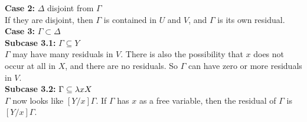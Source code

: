 \textbf{Case 2:} $\Delta$ disjoint from $\Gamma$\\
If they are disjoint, then $\Gamma$ is contained in $U$ and $V$, and $\Gamma$ is its own residual.\\

\textbf{Case 3:} $\Gamma \subset \Delta$\\
\textbf{Subcase 3.1:} $\Gamma \subseteq Y$\\
$\Gamma$ may have many residuals in $V$. There is also the possibility that $x$ does not occur at all in $X$, and there are no residuals. So $\Gamma$ can have zero or more residuals in $V$.\\
\textbf{Subcase 3.2:} $\Gamma \subseteq \lambda xX$\\
$\Gamma$ now looks like $[Y/x]\Gamma$. If $\Gamma$ has $x$ as a free variable, then the residual of $\Gamma$ is $[Y/x]\Gamma$.\\